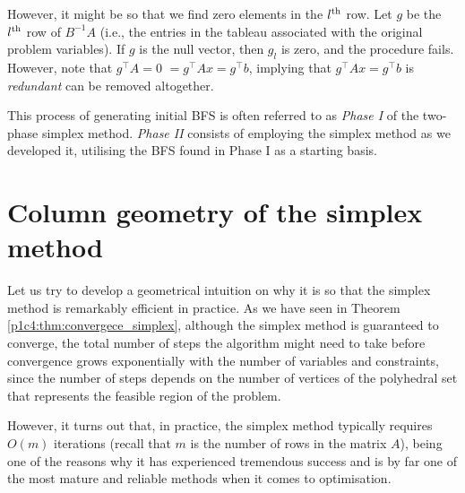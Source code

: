However, it might be so that we find zero elements in the $l^\text{th}$ row. Let $g$ be the $l^\text{th}$ row of $B^{-1}A$ (i.e., the entries in the tableau associated with the original problem variables). If $g$ is the null vector, then $g_l$ is zero, and the procedure fails. However, note that $g^\top A = 0 $ $= g^\top Ax = g^\top b$, implying that $g^\top Ax = g^\top b$ is \emph{redundant} can be removed altogether. 

This process of generating initial BFS is often referred to as \emph{Phase I} of the two-phase simplex method. \emph{Phase II} consists of employing the simplex method as we developed it, utilising the BFS found in Phase I as a starting basis.


\section{Column geometry of the simplex method}

Let us try to develop a geometrical intuition on why it is so that the simplex method is remarkably efficient in practice. As we have seen in Theorem \ref{p1c4:thm:convergece_simplex}, although the simplex method is guaranteed to converge, the total number of steps the algorithm might need to take before convergence grows exponentially with the number of variables and constraints, since the number of steps depends on the number of vertices of the polyhedral set that represents the feasible region of the problem. 

However, it turns out that, in practice, the simplex method typically requires $O(m)$ iterations (recall that $m$ is the number of rows in the matrix $A$), being one of the reasons why it has experienced tremendous success and is by far one of the most mature and reliable methods when it comes to optimisation. 

